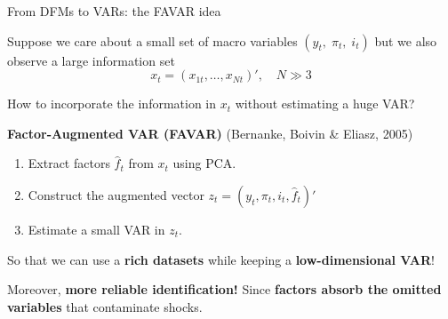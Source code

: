 \documentclass{beamer}
\begin{document}
\begin{frame}{From DFMs to VARs: the FAVAR idea}
\small

Suppose we care about a small set of macro variables $(y_t,\; \pi_t,\; i_t)$ but we also observe a large information set 
\[
x_t = (x_{1t}, \dots, x_{Nt})',
\quad N \gg 3
\]

\medskip
How to incorporate the information in $x_t$ without estimating a huge VAR?

\bigskip
\textbf{Factor-Augmented VAR (FAVAR)} (Bernanke, Boivin \& Eliasz, 2005)
\begin{enumerate}
    \item Extract factors $\hat{f}_t$ from $x_t$ using PCA.
    \item Construct the augmented vector $   z_t = (y_t, \pi_t, i_t, \hat{f}_t)'$
    \item Estimate a small VAR in $z_t$.
\end{enumerate}

\medskip
So that we can use a \textbf{rich datasets} while keeping a \textbf{low-dimensional VAR}!

\medskip

Moreover, \textbf{more reliable identification!} Since\textbf{ factors absorb the omitted variables }that contaminate shocks.

\end{frame}
\end{document}
